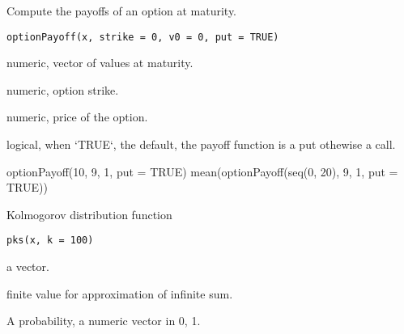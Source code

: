 \documentclass[a4paper]{book}
\begin{document}
%
\begin{Description}\relax
Compute the payoffs of an option at maturity.
\end{Description}
%
\begin{Usage}
\begin{verbatim}
optionPayoff(x, strike = 0, v0 = 0, put = TRUE)
\end{verbatim}
\end{Usage}
%
\begin{Arguments}
\begin{ldescription}
\item[\code{x}] numeric, vector of values at maturity.

\item[\code{strike}] numeric, option strike.

\item[\code{v0}] numeric, price of the option.

\item[\code{put}] logical, when `TRUE`, the default, the payoff function is a put othewise a call.
\end{ldescription}
\end{Arguments}
%
\begin{Examples}
\begin{ExampleCode}
optionPayoff(10, 9, 1, put = TRUE)
mean(optionPayoff(seq(0, 20), 9, 1, put = TRUE))

\end{ExampleCode}
\end{Examples}
%
\begin{Description}\relax
Kolmogorov distribution function
\end{Description}
%
\begin{Usage}
\begin{verbatim}
pks(x, k = 100)
\end{verbatim}
\end{Usage}
%
\begin{Arguments}
\begin{ldescription}
\item[\code{x}] a vector.

\item[\code{k}] finite value for approximation of infinite sum.
\end{ldescription}
\end{Arguments}
%
\begin{Value}
A probability, a numeric vector in 0, 1.
\end{Value}
\end{document}
